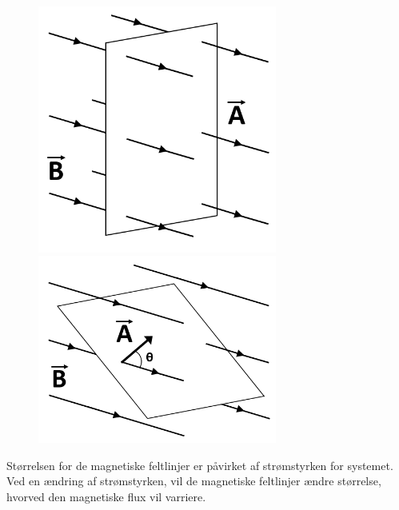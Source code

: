 \begin{figure}[H]
	\centering
	\begin{minipage}[b]{0.48\textwidth}
	\centering
	\includegraphics[width=0.70\textwidth]{Vildledning/Schematics/Magnetfelt_vinkelret} %
	\end{minipage}
	\hfill
	\begin{minipage}[b]{0.48\textwidth}
	\centering
	\includegraphics[width=0.70\textwidth]{Vildledning/Schematics/Magnetfelt_vinklet} %
	\end{minipage}
\end{figure}

Størrelsen for de magnetiske feltlinjer er påvirket af strømstyrken for systemet. Ved en ændring af strømstyrken, vil de magnetiske feltlinjer ændre størrelse, hvorved den magnetiske flux vil varriere. \cite{fysikbog}